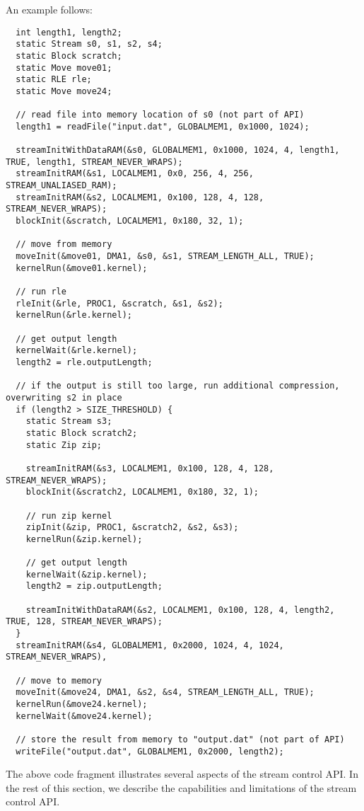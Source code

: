 An example follows:
{\small
\begin{verbatim}
  int length1, length2;
  static Stream s0, s1, s2, s4;
  static Block scratch;
  static Move move01;
  static RLE rle;
  static Move move24;

  // read file into memory location of s0 (not part of API)
  length1 = readFile("input.dat", GLOBALMEM1, 0x1000, 1024);

  streamInitWithDataRAM(&s0, GLOBALMEM1, 0x1000, 1024, 4, length1, TRUE, length1, STREAM_NEVER_WRAPS);
  streamInitRAM(&s1, LOCALMEM1, 0x0, 256, 4, 256, STREAM_UNALIASED_RAM);
  streamInitRAM(&s2, LOCALMEM1, 0x100, 128, 4, 128, STREAM_NEVER_WRAPS);
  blockInit(&scratch, LOCALMEM1, 0x180, 32, 1);

  // move from memory
  moveInit(&move01, DMA1, &s0, &s1, STREAM_LENGTH_ALL, TRUE);
  kernelRun(&move01.kernel);
  
  // run rle
  rleInit(&rle, PROC1, &scratch, &s1, &s2);
  kernelRun(&rle.kernel);

  // get output length
  kernelWait(&rle.kernel);
  length2 = rle.outputLength;
  
  // if the output is still too large, run additional compression, overwriting s2 in place
  if (length2 > SIZE_THRESHOLD) {
    static Stream s3;
    static Block scratch2;
    static Zip zip;

    streamInitRAM(&s3, LOCALMEM1, 0x100, 128, 4, 128, STREAM_NEVER_WRAPS);
    blockInit(&scratch2, LOCALMEM1, 0x180, 32, 1);

    // run zip kernel
    zipInit(&zip, PROC1, &scratch2, &s2, &s3);
    kernelRun(&zip.kernel);
    
    // get output length
    kernelWait(&zip.kernel);
    length2 = zip.outputLength;

    streamInitWithDataRAM(&s2, LOCALMEM1, 0x100, 128, 4, length2, TRUE, 128, STREAM_NEVER_WRAPS);
  }
  streamInitRAM(&s4, GLOBALMEM1, 0x2000, 1024, 4, 1024, STREAM_NEVER_WRAPS),
  
  // move to memory
  moveInit(&move24, DMA1, &s2, &s4, STREAM_LENGTH_ALL, TRUE);
  kernelRun(&move24.kernel);
  kernelWait(&move24.kernel);

  // store the result from memory to "output.dat" (not part of API)
  writeFile("output.dat", GLOBALMEM1, 0x2000, length2); 
\end{verbatim}}

The above code fragment illustrates several aspects of the stream
control API.  In the rest of this section, we describe the
capabilities and limitations of the stream control API.

